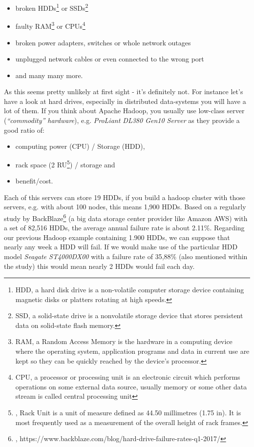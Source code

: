 \begin{itemize}
			\item broken HDDs\footnote{HDD, a hard disk drive is a non-volatile computer storage device containing magnetic disks or platters rotating at high speeds.} or SSDs\footnote{SSD, a solid-state drive is a nonvolatile storage device that stores persistent data on solid-state flash memory.}
			\item faulty RAM\footnote{RAM, a Random Access Memory is the hardware in a computing device where the operating system, application programs and data in current use are kept so they can be quickly reached by the device's processor.} or CPUs\footnote{CPU, a processor or processing unit is an electronic circuit which performs operations on some external data source, usually memory or some other data stream is called central processing unit}
			\item broken power adapters, switches or whole network outages
			\item unplugged network cables or even connected to the wrong port
			\item and many many more.\\
\end{itemize}

As this seems pretty unlikely at first sight - it's definitely not. For instance let's have a look at hard drives, especially in distributed data-systems you will have a lot of them. If you think about Apache Hadoop, you usually use low-class server (\textit{``commodity'' hardware}), e.g. \textit{ProLiant DL380 Gen10 Server} as they provide a good ratio of:

\begin{itemize}
			\item computing power (CPU) / Storage (HDD), 
			\item rack space (2 RU\footnote{\cite{WPRU}, Rack Unit is a unit of measure defined as 44.50 millimetres (1.75 in). It is most frequently used as a measurement of the overall height of rack frames.}) / storage and 
			\item benefit/cost.\\
\end{itemize}
Each of this servers can store 19 HDDs, if you build a hadoop cluster with those servers, e.g. with about 100 nodes, this means 1,900 HDDs. Based on a regularly study by BackBlaze\footnote{\cite{HDDSTDY}, https://www.backblaze.com/blog/hard-drive-failure-rates-q1-2017/} (a big data storage center provider like Amazon AWS) with a set of 82,516 HDDs, the average annual failure rate is about 2.11\%. Regarding our previous Hadoop example containing 1.900 HDDs, we can suppose that nearly any week a HDD will fail. If we would make use of the particular HDD model \textit{Seagate ST4000DX00} with a failure rate of 35,88\% (also mentioned within the study) this would mean nearly 2 HDDs would fail each day.\\


